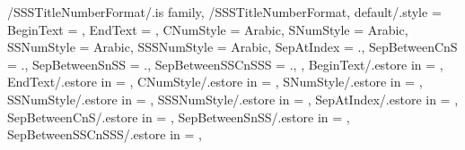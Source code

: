 \newcommand\GetSubSectionTitleNumberFormatString{}
\newcommand\SetupSubSectionTitleNumberFormatString
{%
  \SetupTitleNumberFormatString{SubSection}%
  {%
    BeginText=\GetSSTitleNumberFormatBeginText,%
    EndText=\GetSSTitleNumberFormatEndText,%
    CNumStyle=\GetSSTitleNumberFormatCNumStyle,%
    SNumStyle=\GetSSTitleNumberFormatSNumStyle,%
    SSNumStyle=\GetSSTitleNumberFormatSSNumStyle,%
    SepAtIndex=\GetSSTitleNumberFormatSepAtIndex,%
    SepBetweenCnS=\GetSSTitleNumberFormatSepBetweenCnS,%
    SepBetweenSnSS=\GetSSTitleNumberFormatSepBetweenSnSS,%
    CCounterName=chapter,%
    SCounterName=section,%
    SSCounterName=subsection,%
  }{\GetSubSectionTitleNumberFormatString}%
} %


\pgfkeys
{
  /SSSTitleNumberFormat/.is family, /SSSTitleNumberFormat,
  default/.style =
  {
    BeginText = \empty,
    EndText = \empty,
    CNumStyle = Arabic,
    SNumStyle = Arabic,
    SSNumStyle = Arabic,
    SSSNumStyle = Arabic,
    SepAtIndex = {.}, %
    SepBetweenCnS = {.}, %
    SepBetweenSnSS = {.}, %
    SepBetweenSSCnSSS = {.}, %
  },
  BeginText/.estore in = \GetSSSTitleNumberFormatBeginText,
  EndText/.estore in = \GetSSSTitleNumberFormatEndText,
  CNumStyle/.estore in = \GetSSSTitleNumberFormatCNumStyle,
  SNumStyle/.estore in = \GetSSSTitleNumberFormatSNumStyle,
  SSNumStyle/.estore in = \GetSSSTitleNumberFormatSSNumStyle,
  SSSNumStyle/.estore in = \GetSSSTitleNumberFormatSSSNumStyle,
  SepAtIndex/.estore in = \GetSSSTitleNumberFormatSepAtIndex,
  SepBetweenCnS/.estore in = \GetSSSTitleNumberFormatSepBetweenCnS,
  SepBetweenSnSS/.estore in = \GetSSSTitleNumberFormatSepBetweenSnSS,
  SepBetweenSSCnSSS/.estore in = \GetSSSTitleNumberFormatSepBetweenSSCnSSS,
} %

\newcommand\GetSubSubSectionTitleNumberFormatString{}
\newcommand\SetupSubSubSectionTitleNumberFormatString
{%
  \SetupTitleNumberFormatString{SubSubSection}%
  {%
    BeginText=\GetSSSTitleNumberFormatBeginText,%
    EndText=\GetSSSTitleNumberFormatEndText,%
    CNumStyle=\GetSSSTitleNumberFormatCNumStyle,%
    SNumStyle=\GetSSSTitleNumberFormatSNumStyle,%
    SSNumStyle=\GetSSSTitleNumberFormatSSNumStyle,%
    SSSNumStyle=\GetSSSTitleNumberFormatSSSNumStyle,%
    SepAtIndex=\GetSSSTitleNumberFormatSepAtIndex,%
    SepBetweenCnS=\GetSSSTitleNumberFormatSepBetweenCnS,%
    SepBetweenSnSS=\GetSSSTitleNumberFormatSepBetweenSnSS,%
    SepBetweenSSCnSSS=\GetSSSTitleNumberFormatSepBetweenSSCnSSS,%
    CCounterName=chapter,%
    SCounterName=section,%
    SSCounterName=subsection,%
    SSSCounterName=subsubsection,%
  }{\GetSubSubSectionTitleNumberFormatString}%
} %

